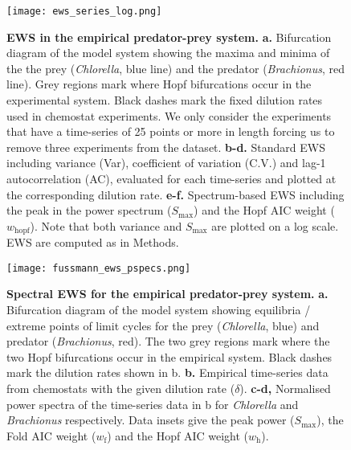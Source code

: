 \documentclass[10pt]{article}
\begin{document}
\begin{figure}[H]
\centering
\texttt{[image: ews\_series\_log.png]}
\vspace{0.4cm}
\caption{\textbf{EWS in the empirical predator-prey system.} \textbf{a.} Bifurcation diagram of the model system showing the maxima and minima of the the prey (\textit{Chlorella}, blue line) and the predator (\textit{Brachionus}, red line). Grey regions mark where Hopf bifurcations occur in the experimental system. Black dashes mark the fixed dilution rates used in chemostat experiments. We only consider the experiments that have a time-series of 25 points or more in length forcing us to remove three experiments from the dataset. \textbf{b-d.} Standard EWS including variance (Var), coefficient of variation (C.V.) and lag-1 autocorrelation (AC), evaluated for each time-series and plotted at the corresponding dilution rate. \textbf{e-f.} Spectrum-based EWS including the peak in the power spectrum ($S_{\text{max}}$) and the Hopf AIC weight ($w_{\text{hopf}}$). Note that both variance and $S_{\text{max}}$ are plotted on a log scale. EWS are computed as in Methods.}
\label{fig:fussmann_ews}
\end{figure}


\begin{figure}[H]
\centering
\texttt{[image: fussmann\_ews\_pspecs.png]}
\vspace{0.4cm}
\caption{\textbf{Spectral EWS for the empirical predator-prey system.} \textbf{a.} Bifurcation diagram of the model system showing equilibria / extreme points of limit cycles for the prey (\textit{Chlorella}, blue) and predator (\textit{Brachionus}, red). The two grey regions mark where the two Hopf bifurcations occur in the empirical system. Black dashes mark the dilution rates shown in b. \textbf{b.} Empirical time-series data from chemostats with the given dilution rate ($\delta$). \textbf{c-d,} Normalised power spectra of the time-series data in b for \textit{Chlorella} and \textit{Brachionus} respectively. Data insets give the peak power ($S_{\text{max}}$), the Fold AIC weight ($w_{\text{f}}$) and the Hopf AIC weight ($w_{\text{h}}$).}
\label{fig:fussmann_ews_pspecs}
\end{figure}
\end{document}
